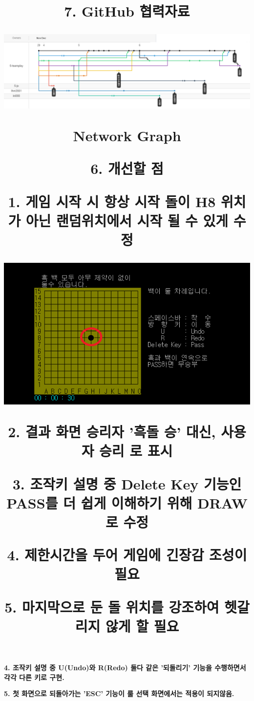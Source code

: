 \documentclass[a4paper, 11pt]{article}
\begin{document}
{{{\textbf{4. 조작키 설명 중 U(Undo)와 R(Redo) 둘다 같은 '되돌리기' 기능을 수행하면서}
  \textbf{\quad 각각 다른 키로 구현.}
 	
\textbf{5. 첫 화면으로 되돌아가는 'ESC' 기능이 룰 선택 화면에서는 적용이 되지않음.}
}
	\vspace{3cm}
\newpage
	\title{\textbf{\Huge6. 개선할 점 }
		
	\vspace{1cm}
		
	{\large		
		
\textbf{ 1. 게임 시작 시 항상 시작 돌이 H8 위치가 아닌 랜덤위치에서 시작 될 수 있게 수정\\}

\includegraphics[width=1.0\linewidth]{6th.png}
		
\textbf{2. 결과 화면 승리자  '흑돌 승' 대신, 사용자 승리 로 표시}
		
\textbf{3. 조작키 설명 중 Delete Key 기능인 PASS를 더 쉽게 이해하기 위해 DRAW로 수정 }
		
\textbf{4. 제한시간을 두어 게임에 긴장감 조성이 필요}
		
\textbf{5. 마지막으로 둔 돌 위치를 강조하여 헷갈리지 않게 할 필요}
}

\newpage

	\title{\textbf{\Huge7. GitHub 협력자료 }
		
	\vspace{2cm}
		\includegraphics[width=1.0\linewidth]{network.png}
	\begin{center}
		\textbf{\Large Network Graph} 
	\end{center}

}}}}
\end{document}
